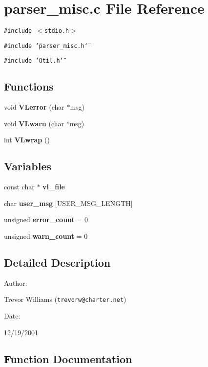 \section{parser\_\-misc.c File Reference}
\label{parser__misc_8c}
{\tt \#include $<$stdio.h$>$}\par
{\tt \#include \char`\"{}parser\_\-misc.h\char`\"{}}\par
{\tt \#include \char`\"{}util.h\char`\"{}}\par
\subsection*{Functions}
\begin{CompactItemize}
\item 
void {\bf VLerror} (char $\ast$msg)
\item 
void {\bf VLwarn} (char $\ast$msg)
\item 
int {\bf VLwrap} ()
\end{CompactItemize}
\subsection*{Variables}
\begin{CompactItemize}
\item 
const char $\ast$ {\bf vl\_\-file}
\item 
char {\bf user\_\-msg} [USER\_\-MSG\_\-LENGTH]
\item 
unsigned {\bf error\_\-count} = 0
\item 
unsigned {\bf warn\_\-count} = 0
\end{CompactItemize}


\subsection{Detailed Description}


\begin{Desc}
\item[Author: ]\par
Trevor Williams ({\tt trevorw@charter.net}) \end{Desc}
\begin{Desc}
\item[Date: ]\par
12/19/2001\end{Desc}


\subsection{Function Documentation}
